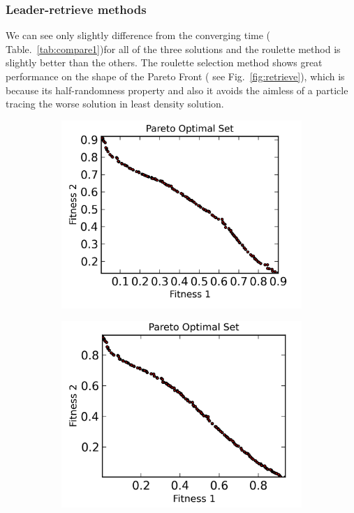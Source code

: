 \documentclass[11pt, runningheads,a4paper]{llncs}
\begin{document}
\subsubsection{Leader-retrieve methods}
We can see only slightly difference from the converging time ( Table.~\ref{tab:compare1})for all of the three solutions and the roulette method is slightly better than the others. The roulette selection method shows great performance on the shape of the Pareto Front ( see Fig.~\ref{fig:retrieve}), which is because its half-randomness property and also it avoids the aimless of a particle tracing the worse solution in least density solution.


\begin{figure}
        \centering
        \begin{subfigure}[b]{0.3\textwidth}
                \centering
                \includegraphics[width=\textwidth]{./figs/leastdensity.png}
                \label{fig:ra}
        \end{subfigure}
        \begin{subfigure}[b]{0.3\textwidth}
                \centering
                \includegraphics[width=\textwidth]{./figs/tournament.png}

\end{subfigure}
\end{figure}
\end{document}

